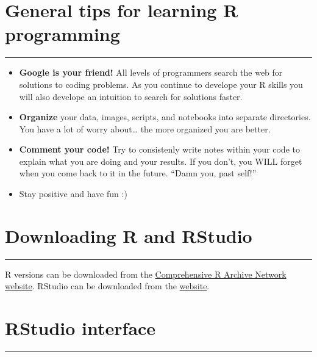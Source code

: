\documentclass[
]{article}
\providecommand{\tightlist}{%
  \setlength{\itemsep}{0pt}\setlength{\parskip}{0pt}}
\begin{document}
\hypertarget{general-tips-for-learning-r-programming}{%
\section{General tips for learning R
programming}\label{general-tips-for-learning-r-programming}}

\begin{center}\rule{0.5\linewidth}{\linethickness}\end{center}

\begin{itemize}
\tightlist
\item
  \textbf{Google is your friend!} All levels of programmers search the
  web for solutions to coding problems. As you continue to develope your
  R skills you will also develope an intuition to search for solutions
  faster.
\item
  \textbf{Organize} your data, images, scripts, and notebooks into
  separate directories. You have a lot of worry about\ldots{} the more
  organized you are better.
\item
  \textbf{Comment your code!} Try to consistenly write notes within your
  code to explain what you are doing and your results. If you don't, you
  WILL forget when you come back to it in the future. ``Damn you, past
  self!''
\item
  Stay positive and have fun :)
\end{itemize}

\hypertarget{downloading-r-and-rstudio}{%
\section{Downloading R and RStudio}\label{downloading-r-and-rstudio}}

\begin{center}\rule{0.5\linewidth}{\linethickness}\end{center}

R versions can be downloaded from the
\href{https://cran.r-project.org/}{Comprehensive R Archive Network
website}. RStudio can be downloaded from the
\href{https://www.rstudio.com/products/rstudio/download/}{website}.

\hypertarget{rstudio-interface}{%
\section{RStudio interface}\label{rstudio-interface}}

\begin{center}\rule{0.5\linewidth}{\linethickness}\end{center}
\end{document}
